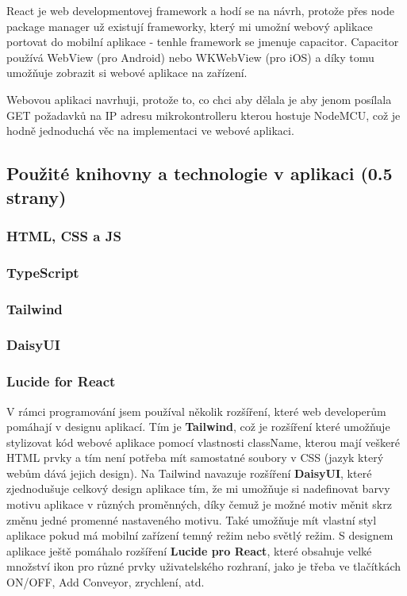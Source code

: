 React je web developmentovej framework a hodí se na návrh, protože přes node package manager už existují frameworky, který mi umožní webový aplikace portovat do mobilní aplikace - tenhle framework se jmenuje capacitor. Capacitor používá WebView (pro Android) nebo WKWebView (pro iOS) a díky tomu umožňuje zobrazit si webové aplikace na zařízení.\cite{CapacitorDocumentationFAQ}

Webovou aplikaci navrhuji, protože to, co chci aby dělala je aby jenom posílala GET požadavků na IP adresu mikrokontrolleru kterou hostuje NodeMCU, což je hodně jednoduchá věc na implementaci ve webové aplikaci.


\subsection{Použité knihovny a technologie v aplikaci (0.5 strany)}

\subsubsection{HTML, CSS a JS}

\subsubsection{TypeScript}

\subsubsection{Tailwind}

\subsubsection{DaisyUI}

\subsubsection{Lucide for React}

V rámci programování jsem používal několik rozšíření, které web developerům pomáhají v designu aplikací. Tím je \textbf{Tailwind}, což je rozšíření které umožňuje stylizovat kód webové aplikace pomocí vlastnosti className, kterou mají veškeré HTML prvky a tím není potřeba mít samostatné soubory v CSS (jazyk který webům dává jejich design). Na Tailwind navazuje rozšíření \textbf{DaisyUI}, které zjednodušuje celkový design aplikace tím, že mi umožňuje si nadefinovat barvy motivu aplikace v různých proměnných, díky čemuž je možné motiv měnit skrz změnu jedné promenné nastaveného motivu. Také umožňuje mít vlastní styl aplikace pokud má mobilní zařízení temný režim nebo světlý režim. S designem aplikace ještě pomáhalo rozšíření \textbf{Lucide pro React}, které obsahuje velké množství ikon pro různé prvky uživatelského rozhraní, jako je třeba ve tlačítkách ON/OFF, Add Conveyor, zrychlení, atd.

